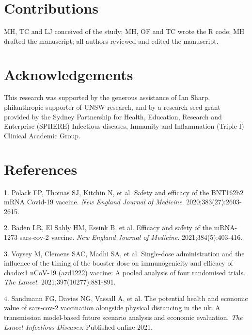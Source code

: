 \documentclass{article}
\begin{document}
\hypertarget{contributions}{%
\section{Contributions}\label{contributions}}

MH, TC and LJ conceived of the study; MH, OF and TC wrote the R code; MH
drafted the manuscript; all authors reviewed and edited the manuscript.

\hypertarget{acknowledgements}{%
\section{Acknowledgements}\label{acknowledgements}}

This research was supported by the generous assistance of Ian Sharp,
philanthropic supporter of UNSW research, and by a research seed grant
provided by the Sydney Partnership for Health, Education, Research and
Enterprise (SPHERE) Infectious diseases, Immunity and Inflammation
(Triple-I) Clinical Academic Group.

\newpage

\hypertarget{references}{%
\section*{References}\label{references}}

\hypertarget{refs}{}
\leavevmode\hypertarget{ref-polack2020safety}{}%
1. Polack FP, Thomas SJ, Kitchin N, et al. Safety and efficacy of the
BNT162b2 mRNA Covid-19 vaccine. \emph{New England Journal of Medicine}.
2020;383(27):2603-2615.

\leavevmode\hypertarget{ref-baden2021efficacy}{}%
2. Baden LR, El Sahly HM, Essink B, et al. Efficacy and safety of the
mRNA-1273 sars-cov-2 vaccine. \emph{New England Journal of Medicine}.
2021;384(5):403-416.

\leavevmode\hypertarget{ref-voysey2021single}{}%
3. Voysey M, Clemens SAC, Madhi SA, et al. Single-dose administration
and the influence of the timing of the booster dose on immunogenicity
and efficacy of chadox1 nCoV-19 (azd1222) vaccine: A pooled analysis of
four randomised trials. \emph{The Lancet}. 2021;397(10277):881-891.

\leavevmode\hypertarget{ref-sandmann2021potential}{}%
4. Sandmann FG, Davies NG, Vassall A, et al. The potential health and
economic value of sars-cov-2 vaccination alongside physical distancing
in the uk: A transmission model-based future scenario analysis and
economic evaluation. \emph{The Lancet Infectious Diseases}. Published
online 2021.
\end{document}
